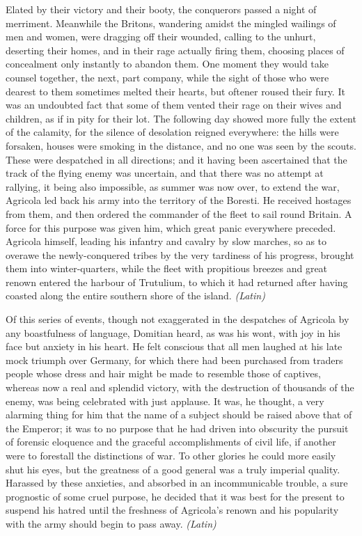 Elated by their victory and their booty, the conquerors passed a night of merriment. Meanwhile the Britons, wandering amidst the mingled wailings of men and women, were dragging off their wounded, calling to the unhurt, deserting their homes, and in their rage actually firing them, choosing places of concealment only instantly to abandon them. One moment they would take counsel together, the next, part company, while the sight of those who were dearest to them sometimes melted their hearts, but oftener roused their fury. It was an undoubted fact that some of them vented their rage on their wives and children, as if in pity for their lot. The following day showed more fully the extent of the calamity, for the silence of desolation reigned everywhere: the hills were forsaken, houses were smoking in the distance, and no one was seen by the scouts. These were despatched in all directions; and it having been ascertained that the track of the flying enemy was uncertain, and that there was no attempt at rallying, it being also impossible, as summer was now over, to extend the war, Agricola led back his army into the territory of the Boresti. He received hostages from them, and then ordered the commander of the fleet to sail round Britain. A force for this purpose was given him, which great panic everywhere preceded. Agricola himself, leading his infantry and cavalry by slow marches, so as to overawe the newly-conquered tribes by the very tardiness of his progress, brought them into winter-quarters, while the fleet with propitious breezes and great renown entered the harbour of Trutulium, to which it had returned after having coasted along the entire southern shore of the island. \emph{(Latin)}


Of this series of events, though not exaggerated in the despatches of Agricola by any boastfulness of language, Domitian heard, as was his wont, with joy in his face but anxiety in his heart. He felt conscious that all men laughed at his late mock triumph over Germany, for which there had been purchased from traders people whose dress and hair might be made to resemble those of captives, whereas now a real and splendid victory, with the destruction of thousands of the enemy, was being celebrated with just applause. It was, he thought, a very alarming thing for him that the name of a subject should be raised above that of the Emperor; it was to no purpose that he had driven into obscurity the pursuit of forensic eloquence and the graceful accomplishments of civil life, if another were to forestall the distinctions of war. To other glories he could more easily shut his eyes, but the greatness of a good general was a truly imperial quality. Harassed by these anxieties, and absorbed in an incommunicable trouble, a sure prognostic of some cruel purpose, he decided that it was best for the present to suspend his hatred until the freshness of Agricola's renown and his popularity with the army should begin to pass away. \emph{(Latin)}

